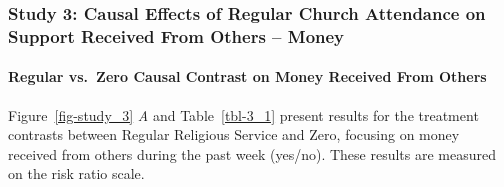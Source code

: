 \documentclass[
  single column]{article}
\let\oldparagraph\paragraph
\renewcommand{\paragraph}[1]{\oldparagraph{#1}\mbox{}}
\begin{document}
\newpage{}

\subsubsection{Study 3: Causal Effects of Regular Church Attendance on
Support Received From Others --
Money}\label{study-3-causal-effects-of-regular-church-attendance-on-support-received-from-others-money}

\paragraph{Regular vs.~Zero Causal Contrast on Money Received From
Others}\label{regular-vs.-zero-causal-contrast-on-money-received-from-others}

Figure~\ref{fig-study_3} \emph{A} and Table~\ref{tbl-3_1} present
results for the treatment contrasts between Regular Religious Service
and Zero, focusing on money received from others during the past week
(yes/no). These results are measured on the risk ratio scale.
\end{document}
